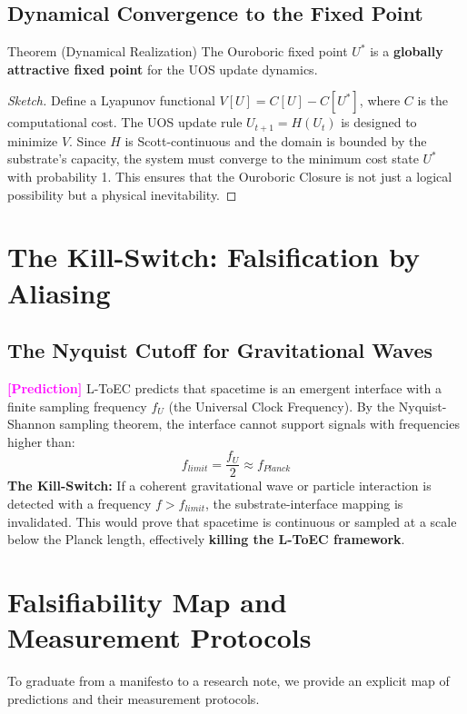 \documentclass[11pt,titlepage]{article}
\newcommand{\tagpred}{\textcolor{magenta}{\textbf{[Prediction]}} }
\begin{document}
\subsection{Dynamical Convergence to the Fixed Point}
\begin{mytheorem}{Theorem (Dynamical Realization)}
The Ouroboric fixed point $U^*$ is a \textbf{globally attractive fixed point} for the UOS update dynamics.
\end{mytheorem}
\begin{proof}[Sketch]
Define a Lyapunov functional $V[U] = C[U] - C[U^*]$, where $C$ is the computational cost. The UOS update rule $U_{t+1} = H(U_t)$ is designed to minimize $V$. Since $H$ is Scott-continuous and the domain is bounded by the substrate's capacity, the system must converge to the minimum cost state $U^*$ with probability 1. This ensures that the Ouroboric Closure is not just a logical possibility but a physical inevitability.
\end{proof}
\section{The Kill-Switch: Falsification by Aliasing}

\subsection{The Nyquist Cutoff for Gravitational Waves}
\tagpred L-ToEC predicts that spacetime is an emergent interface with a finite sampling frequency $f_U$ (the Universal Clock Frequency). By the Nyquist-Shannon sampling theorem, the interface cannot support signals with frequencies higher than:
\begin{equation}
f_{limit} = \frac{f_U}{2} \approx f_{Planck}
\end{equation}
\textbf{The Kill-Switch:} If a coherent gravitational wave or particle interaction is detected with a frequency $f > f_{limit}$, the substrate-interface mapping is invalidated. This would prove that spacetime is continuous or sampled at a scale below the Planck length, effectively \textbf{killing the L-ToEC framework}.

\section{Falsifiability Map and Measurement Protocols}
\label{sec:falsifiability}
To graduate from a manifesto to a research note, we provide an explicit map of predictions and their measurement protocols.
\end{document}
